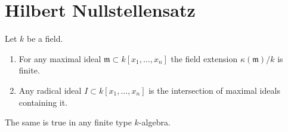 \section{Hilbert Nullstellensatz}
\label{section-nullstellensatz}

\begin{theorem}
\label{theorem-nullstellensatz}
Let $k$ be a field.
\begin{enumerate}
\item
\label{item-finite-kappa}
For any maximal ideal $\mathfrak m \subset k[x_1, \ldots, x_n]$
the field extension $\kappa(\mathfrak m)/k$ is finite.
\item
\label{item-polynomial-ring-Jacobson}
Any radical ideal $I \subset k[x_1, \ldots, x_n]$
is the intersection of maximal ideals containing it.
\end{enumerate}
The same is true in any finite type $k$-algebra.
\end{theorem}

